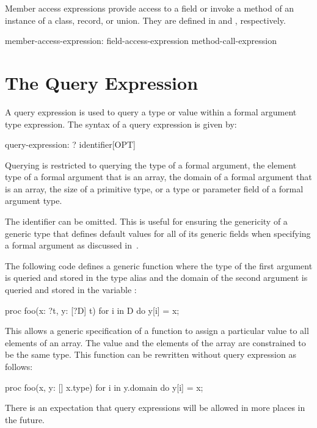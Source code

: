 Member access expressions provide access to a field or invoke a method
of an instance of a class, record, or union.
They are defined in  and
, respectively.

\begin{syntax}
member-access-expression:
  field-access-expression
  method-call-expression
\end{syntax}

\section{The Query Expression}
\label{The_Query_Expression}

A query expression is used to query a type or value within a formal
argument type expression.  The syntax of a query expression is given
by:
\begin{syntax}
query-expression:
  ? identifier[OPT]
\end{syntax}
Querying is restricted to querying the type of a formal argument, the
element type of a formal argument that is an array, the domain of a
formal argument that is an array, the size of a primitive type, or a
type or parameter field of a formal argument type.

The identifier can be omitted.  This is useful for ensuring the
genericity of a generic type that defines default values for all of
its generic fields when specifying a formal argument as discussed
in~.

\begin{example}
The following code defines a generic function where the type of the
first argument is queried and stored in the type alias  and
the domain of the second argument is queried and stored in the
variable :
\begin{chapel}
proc foo(x: ?t, y: [?D] t) {
  for i in D do
    y[i] = x;
}
\end{chapel}
This allows a generic specification of a function to assign a
particular value to all elements of an array.  The value and the
elements of the array are constrained to be the same type.  This
function can be rewritten without query expression as follows:
\begin{chapel}
proc foo(x, y: [] x.type) {
  for i in y.domain do
    y[i] = x;
}
\end{chapel}
\end{example}

There is an expectation that query expressions will be allowed in more
places in the future.

